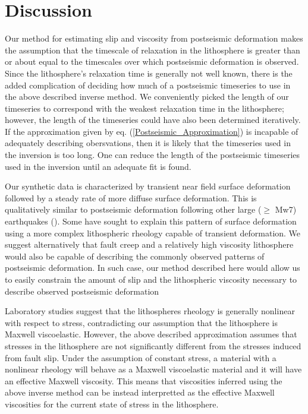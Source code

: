 \documentclass[fleqn,12pt]{article}
\begin{document}
\section{Discussion}

Our method for estimating slip and viscosity from postseismic
deformation makes the assumption that the timescale of relaxation in
the lithosphere is greater than or about equal to the timescales over
which postseismic deformation is observed.  Since the lithosphere's
relaxation time is generally not well known, there is the added
complication of deciding how much of a postseismic timeseries to use
in the above described inverse method.  We conveniently picked the
length of our timeseries to correspond with the weakest relaxation
time in the lithosphere; however, the length of the timeseries could
have also been determined iteratively.  If the approximation given by
eq. (\ref{Postseismic_Approximation}) is incapable of adequately
describing obersvations, then it is likely that the timeseries used in
the inversion is too long.  One can reduce the length of the
postseismic timeseries used in the inversion until an adequate fit is
found.

Our synthetic data is characterized by transient near field surface
deformation followed by a steady rate of more diffuse surface
deformation.  This is qualitatively similar to postseismic
deformation following other large ($\geq$ Mw7) earthquakes
(\citep{P2003,P2005,R2007,R2015}).  Some have sought to explain this
pattern of surface deformation using a more complex lithospheric
rheology capable of transient deformation. We suggest
alternatively that fault creep and a relatively high viscosity
lithosphere would also be capable of describing the commonly observed
patterns of postseismic deformation.  In such case, our method
described here would allow us to easily constrain the amount of slip
and the lithospheric viscosity necessary to describe observed
postseismic deformation

Laboratory studies suggest that the lithospheres rheology is generally
nonlinear with respect to stress, contradicting our assumption that
the lithosphere is Maxwell viscoelastic.  However, the above described
approximation assumes that stresses in the lithosphere are not
significantly different from the stresses induced from fault slip.
Under the assumption of constant stress, a material with a nonlinear
rheology will behave as a Maxwell viscoelastic material and it will
have an effective Maxwell viscosity.  This means that viscosities
inferred using the above inverse method can be instead interpretted as
the effective Maxwell viscosities for the current state of stress in
the lithosphere.
\end{document}
